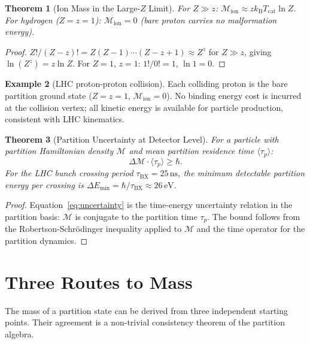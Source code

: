 \documentclass[twocolumn,10pt,a4paper]{article}
\theoremstyle{thmstyle}
\newtheorem{theorem}{Theorem}[section]
\theoremstyle{definition}
\newtheorem{example}[theorem]{Example}
\theoremstyle{remark}
\newcommand{\kB}{k_{\mathrm{B}}}
\newcommand{\Mop}{\mathcal{M}}
\newcommand{\Tcat}{T_{\mathrm{cat}}}
\begin{document}
\begin{theorem}[Ion Mass in the Large-$Z$ Limit]
\label{thm:ion_mass_limit}
For $Z \gg z$:
$\Mop_{\mathrm{ion}} \approx z\kB\Tcat\ln Z$.
For hydrogen ($Z = z = 1$): $\Mop_{\mathrm{ion}} = 0$ (bare proton carries
no malformation energy).
\end{theorem}

\begin{proof}
$Z!/(Z-z)! = Z(Z-1)\cdots(Z-z+1) \approx Z^z$ for $Z \gg z$,
giving $\ln(Z^z) = z\ln Z$.
For $Z = 1$, $z = 1$: $1!/0! = 1$, $\ln 1 = 0$.
\end{proof}

\begin{example}[LHC proton-proton collision]
Each colliding proton is the bare partition ground state ($Z = z = 1$,
$\Mop_{\mathrm{ion}} = 0$). No binding energy cost is incurred at the
collision vertex; all kinetic energy is available for particle production,
consistent with LHC kinematics.
\end{example}

\begin{theorem}[Partition Uncertainty at Detector Level]
\label{thm:uncertainty}
For a particle with partition Hamiltonian density $\Mop$ and mean
partition residence time $\langle\tau_p\rangle$:
\begin{equation}
\Delta\Mop\cdot\langle\tau_p\rangle \geq \hbar.
\label{eq:uncertainty}
\end{equation}
For the LHC bunch crossing period $\tau_{\mathrm{BX}} = 25\,\mathrm{ns}$,
the minimum detectable partition energy per crossing is
$\Delta E_{\min} = \hbar/\tau_{\mathrm{BX}} \approx 26\,\mathrm{eV}$.
\end{theorem}

\begin{proof}
Equation~\eqref{eq:uncertainty} is the time-energy uncertainty relation
in the partition basis: $\Mop$ is conjugate to the partition time $\tau_p$.
The bound follows from the Robertson-Schrödinger inequality applied to
$\Mop$ and the time operator for the partition dynamics.
\end{proof}

\section{Three Routes to Mass}
\label{sec:mass_routes}

The mass of a partition state can be derived from three independent
starting points. Their agreement is a non-trivial consistency theorem
of the partition algebra.
\end{document}
